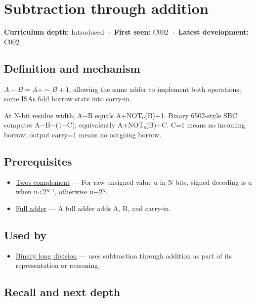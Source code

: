 \hypertarget{appendix-1c7df340573e}{}
\section{Subtraction through addition}\label{appendix-1c7df340573e-subtraction-through-addition}

\textbf{Curriculum depth:} Introduced · \textbf{First seen:} C002 · \textbf{Latest development:} C002

\subsection{Definition and mechanism}\label{appendix-1c7df340573e-definition-and-mechanism}

\(A-B=A+\sim B+1\), allowing the same adder to implement both operations; some ISAs fold borrow state into carry-in.

At N-bit residue width, A−B equals A+NOTₙ(B)+1. Binary 6502-style SBC computes A−B−(1−C), equivalently A+NOT₈(B)+C. C=1 means no incoming borrow; output carry=1 means no outgoing borrow.

\subsection{Prerequisites}\label{appendix-1c7df340573e-prerequisites}

\begin{itemize}
\tightlist
\item
  \hyperref[appendix-4fbc03d20829]{Two\textquotesingle s complement} --- For raw unsigned value u in N bits, signed decoding is u when u\textless2ᴺ⁻¹, otherwise u−2ᴺ.
\item
  \hyperref[appendix-d1a5b1e520c2]{Full adder} --- A full adder adds A, B, and carry-in.
\end{itemize}

\subsection{Used by}\label{appendix-1c7df340573e-used-by}

\begin{itemize}
\tightlist
\item
  \hyperref[appendix-89985e6a2685]{Binary long division} --- uses subtraction through addition as part of its representation or reasoning.
\end{itemize}

\subsection{Recall and next depth}\label{appendix-1c7df340573e-recall-and-next-depth}

